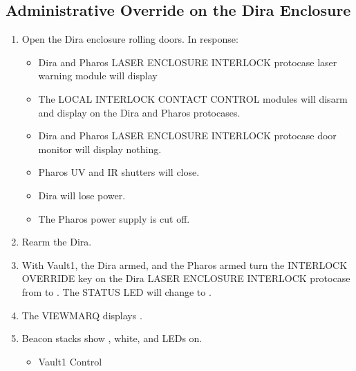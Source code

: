 \documentclass[letterpaper,10pt,english]{sphinxmanual}
\begin{document}
\subsection{Administrative Override on the Dira Enclosure}
\label{\detokenize{testing_documentation/Vault-1_laser:administrative-override-on-the-dira-enclosure}}\begin{enumerate}
%
\item {} 
\sphinxAtStartPar
Open the Dira enclosure rolling doors.
In response:
\begin{itemize}
\item {} 
\sphinxAtStartPar
Dira and Pharos LASER ENCLOSURE INTERLOCK protocase laser warning module will display 

\item {} 
\sphinxAtStartPar
The LOCAL INTERLOCK CONTACT CONTROL modules will disarm and display  on the Dira and Pharos protocases.

\item {} 
\sphinxAtStartPar
Dira and Pharos LASER ENCLOSURE INTERLOCK protocase door monitor will display nothing.

\item {} 
\sphinxAtStartPar
Pharos UV and IR shutters will close.

\item {} 
\sphinxAtStartPar
Dira will lose power.

\item {} 
\sphinxAtStartPar
The Pharos power supply is cut off.

\end{itemize}

\item {} 
\sphinxAtStartPar
Rearm the Dira.

\item {} 
\sphinxAtStartPar
With Vault\sphinxhyphen{}1, the Dira armed, and the Pharos armed turn the INTERLOCK OVERRIDE key on the Dira LASER ENCLOSURE INTERLOCK protocase from  to .
The STATUS LED will change to .

\item {} 
\sphinxAtStartPar
The VIEWMARQ displays .

\item {} 
\sphinxAtStartPar
Beacon stacks show , white, and  LEDs on.
\begin{itemize}
\item {} 
\sphinxAtStartPar
Vault\sphinxhyphen{}1 Control


\end{itemize}
\end{enumerate}
\end{document}
